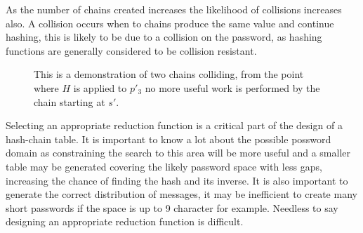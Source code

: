 \documentclass[a4paper,12pt]{article}
\begin{document}
As the number of chains created increases the likelihood of collisions increases also. A collision occurs when to chains produce the same value and continue hashing, this is likely to be due to a collision on the password, as hashing functions are generally considered to be collision resistant.
\begin{figure}
    \begin{center}
\end{center}
\caption{This is a demonstration of two chains colliding, from the point where $H$ is applied to $p'_3$ no more useful work is performed by the chain starting at $s'$.}
\label{fig:col}
\end{figure}

Selecting an appropriate reduction function is a critical part of the design of a hash-chain table. It is important to know a lot about the possible possword domain as constraining the search to this area will be more useful and a smaller table may be generated covering the likely password space with less gaps, increasing the chance of finding the hash and its inverse. It is also important to generate the correct distribution of messages, it may be inefficient to create many short passwords if the space is up to 9 character for example. Needless to say designing an appropriate reduction function is difficult.
\end{document}
